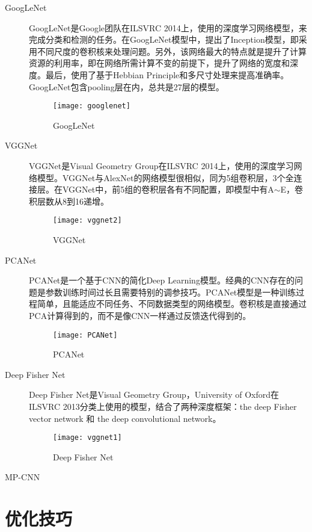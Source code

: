 \begin{description}
\item[GoogLeNet] GoogLeNet\cite{simonyan2014very}是Google团队在ILSVRC 2014上，使用的深度学习网络模型，来完成分类和检测的任务。在GoogLeNet模型中，提出了Inception模型，即采用不同尺度的卷积核来处理问题。另外，该网络最大的特点就是提升了计算资源的利用率，即在网络所需计算不变的前提下，提升了网络的宽度和深度。最后，使用了基于Hebbian Principle和多尺寸处理来提高准确率。GoogLeNet包含pooling层在内，总共是27层的模型。
\begin{figure}[!ht]
\centering
\texttt{[image: googlenet]}
\caption{GoogLeNet}
\end{figure}
\item[VGGNet] VGGNet\cite{szegedy2014going}是Visual Geometry Group在ILSVRC 2014上，使用的深度学习网络模型。VGGNet与AlexNet的网络模型很相似，同为5组卷积层，3个全连接层。在VGGNet中，前5组的卷积层各有不同配置，即模型中有A$\sim$E，卷积层数从8到16递增。%
\begin{figure}[!ht]
\centering
\texttt{[image: vggnet2]}
\caption{VGGNet}
\end{figure}

\item[PCANet] PCANet是一个基于CNN的简化Deep Learning模型。经典的CNN存在的问题是参数训练时间过长且需要特别的调参技巧。PCANet模型是一种训练过程简单，且能适应不同任务、不同数据类型的网络模型。卷积核是直接通过PCA计算得到的，而不是像CNN一样通过反馈迭代得到的。
\begin{figure}[!ht]
\centering
\texttt{[image: PCANet]}
\caption{PCANet}
\end{figure}

\item[Deep Fisher Net] Deep Fisher Net\cite{simonyan2013deep}是Visual Geometry Group，University of Oxford在ILSVRC 2013分类上使用的模型，结合了两种深度框架：the deep Fisher vector network 和 the deep convolutional network。
\begin{figure}[!ht]
\centering
\texttt{[image: vggnet1]}
\caption{Deep Fisher Net}
\end{figure}

\item[MP-CNN]  
\end{description}

\section{优化技巧}
